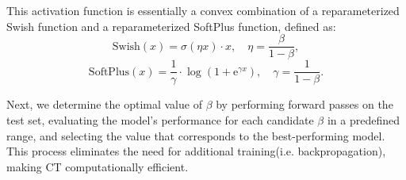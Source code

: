 This activation function is essentially a convex combination of a reparameterized Swish function and a reparameterized SoftPlus function, defined as:
\begin{equation}\label{eq:reparam-swish}
    \text{Swish}(x) = \sigma(\eta x) \cdot x, \quad \eta = \frac{\beta}{1 - \beta},
\end{equation}
\begin{equation}\label{eq:reparam-softplus}
    \text{SoftPlus}(x) = \frac{1}{\gamma} \cdot \log\left(1 + \mathrm{e}^{\gamma x}\right), \quad \gamma = \frac{1}{1 - \beta}.
\end{equation}

Next, we determine the optimal value of $\beta$ by performing forward passes on the test set, evaluating the model's performance for each candidate $\beta$ in a predefined range, and selecting the value that corresponds to the best-performing model. This process eliminates the need for additional training(i.e. backpropagation), making CT computationally efficient.